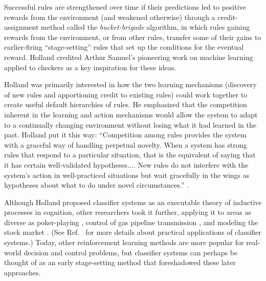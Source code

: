 \documentclass{sig-alternate}
\begin{document}
Successful rules are strengthened over time if their predictions led
to positive rewards from the environment (and weakened otherwise)
through a credit-assignment method called the \emph{bucket-brigade}
algorithm, in which rules gaining rewards from the environment, or from
other rules, transfer some of their gains to earlier-firing
``stage-setting'' rules that set up the conditions for the eventual
reward. Holland credited Arthur Samuel's pioneering work on machine
learning applied to checkers \cite{Samuel1959} as a key inspiration for these ideas.

Holland was primarily interested in how the two
learning mechanisms (discovery of new rules and apportioning credit to
existing rules) could work together to create 
useful default hierarchies of rules.  He emphasized that the
competition inherent in the learning and action mechanisms would allow
the system to adapt to a continually changing environment without
losing what it had learned in the past.  Holland put it this way:
``Competition among rules provides the system with a graceful way of
handling perpetual novelty.  When a system has strong rules that
respond to a particular situation, that is the equivalent of saying
that it has certain well-validated hypotheses.... New rules do not
interfere with the system's action in well-practiced situations but
wait gracefully in the wings as hypotheses about what to do under
novel circumstances.'' \cite{Holland1992}.

Although Holland proposed classifier systems as 
an executable theory of inductive processes in cognition, other researchers took it further, 
applying it to areas as diverse as poker-playing \cite{Smith1980},
control of gas pipeline transmission \cite{Goldberg1983}, and modeling
the stock market \cite{Palmer1994}.  (See Ref.~\cite{Booker1989} for
more details about practical applications of classifier systems.)
Today, other reinforcement learning methods are more popular for
real-world decision and control problems, but classifier systems can
perhaps be thought of as an early stage-setting method that
foreshadowed these later approaches.
\end{document}

